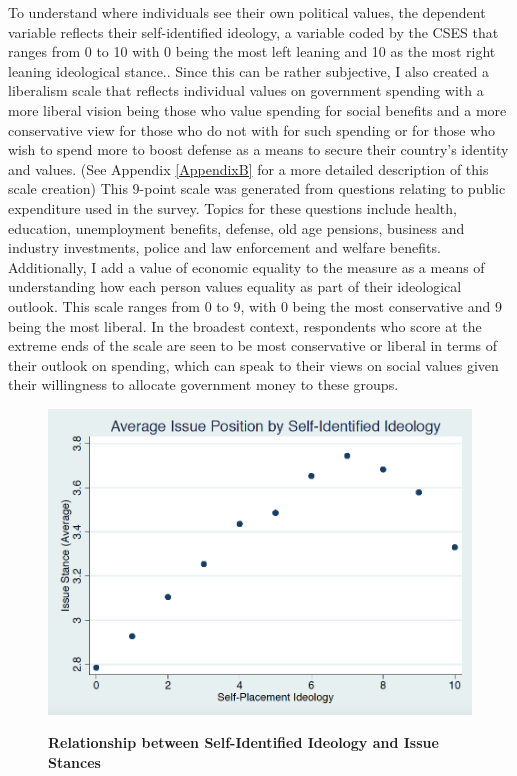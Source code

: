 \documentclass[12pt, titlepage]{article}
\newcommand\tb{\textbf}
\begin{document}
To understand where individuals see their own political values, the dependent variable reflects their self-identified ideology, a variable coded by the CSES that ranges from 0 to 10 with 0 being the most left leaning and 10 as the most right leaning ideological stance.. Since this can be rather subjective, I also created a liberalism scale that reflects individual values on government spending with a more liberal vision being those who value spending for social benefits and a more conservative view for those who do not with for such spending or for those who wish to spend more to boost defense as a means to secure their country's identity and values. (See Appendix \ref{AppendixB} for a more detailed description of this scale creation) This 9-point scale was generated from questions relating to public expenditure used in the survey. Topics for these questions include health, education, unemployment benefits, defense, old age pensions, business and industry investments, police and law enforcement and welfare benefits. Additionally, I add a value of economic equality to the measure as a means of understanding how each person values equality as part of their ideological outlook. This scale ranges from 0 to 9, with 0 being the most conservative and 9 being the most liberal. In the broadest context, respondents who score at the extreme ends of the scale are seen to be most conservative or liberal in terms of their outlook on spending, which can speak to their views on social values given their willingness to allocate government money to these groups.

\begin{figure}[ht!]    \centering
	{	 \includegraphics[width=\textwidth]{AvgLibPF}}
	\caption{\tb{Relationship between Self-Identified Ideology and Issue Stances}}\label{AvgLib}
\end{figure}
\end{document}

